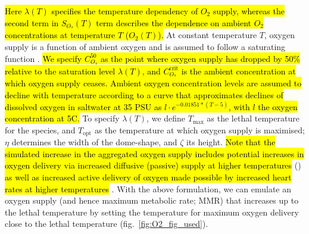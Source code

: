 \documentclass[11pt]{article}\usepackage[]{graphicx}\usepackage[]{color,soul}
\begin{document}
\hl{ Here $\lambda(T)$ specifies the temperature dependency of $O_2$ supply, whereas the second term in $S_{O_2}(T)$ term describes the dependence on ambient $O_2$ concentrations at temperature $T$ ($O_2(T)$).} At constant temperature $T$, oxygen supply is a function of ambient oxygen and is assumed to follow a saturating function \cite[e.g.,][]{lefrancois_influence_2003}. \hl{We specify $C_{O_2}^{\text{50}}$ as the point where oxygen supply has dropped by 50\% relative to the saturation level $\lambda(T)$, and $C_{O_2}^{\text{crit}}$ is the ambient concentration at which oxygen supply ceases. Ambient oxygen concentration levels are assumed to decline with temperature according to a curve that approximates declines of dissolved oxygen in saltwater at 35 PSU as $l\cdot e^{-0.01851*(T-5)}$, with $l$ the oxygen concentration at 5\degree C.} To specify $\lambda(T)$, we define $T_{\text{max}}$ as the lethal temperature for the species, and $T_{\text{opt}}$ as the temperature at which oxygen supply is maximised; $\eta$ determines the width of the dome-shape, and $\zeta$ its height. \hl{Note that the simulated increase in the aggregated oxygen supply includes potential increases in oxygen delivery via increased diffusive (passive) supply at higher temperatures} (\citealt{verberk_oxygen_2011}) \hl{as well as increased active delivery of oxygen made possible by increased heart rates at higher temperatures} \cite[e.g.,][]{lefrancois_influence_2003}. With the above formulation, we can emulate an oxygen supply (and hence maximum metabolic rate; MMR) that increases up to the lethal temperature by setting the temperature for maximum oxygen delivery close to the lethal temperature (fig.~\ref{fig:O2_fig_used}).
\end{document}
